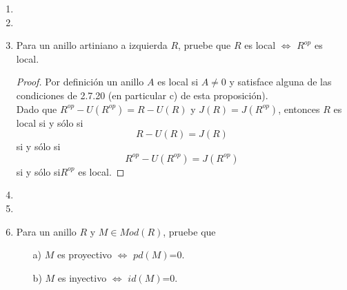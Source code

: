 \documentclass{article}
\begin{document}
\begin{enumerate}[label=\textbf{Ej \arabic*.}]
\begin{proof}
Sea $x\in M$ entonces $x=(x-ex)+ex$ donde $(x-ex)=(1-e)x\in (1-e)M$ y\quad $ex\in eM$. Así $x\in eM\oplus (1-e)M$.\\

Por último, sea $y\in eM$ entonces $y=ex$ para alguna $x\in M$, y por lo anterior, $e(y)=eex=ex=y$. Así $eM=\{m\in M\,|\, e(m)=m\}.$\\
\\
Sea $e=\mu_1\pi_1$ donde $\pi\colon M\longrightarrow M_1$ es la proyección canónica y \\$\mu_1\colon M_1\longrightarrow M$ es la 
inclusión canónica. Entonces $\pi_1\mu_1=Id_{M_1}$, por lo que $e^2(m_1)=\mu_1\pi_1\mu_1\pi_1(m_1)=\mu_1\pi_1(m_1)=e(m_1)$ \,\,
para toda $m_1\in M_1$.\\

Sea $m\in M$ entonces $e(m)=\mu_1\pi_1(m)=\mu_1(\pi_1(m))\in M_1$, por lo que $eM\subseteq M_1$ y todo elemento $x\in M_1$ cumple 
que\\$e(x)=\mu_1\pi_1(x)=\mu_1(x)=x$ por lo que $M_1=eM$.\\

Por otra parte, por a), $M=M_1\oplus(1-e)M$ y por hipótesis $M=M_1\oplus M_2$, entonces $M_2=(1-e)M$ pues si $x\in M$, existe $m_1\in M_1,\,\,
m_2\in M_2\,$ y $m_3\in M$ tales que $x=m_1+m_2=m_1+(1-e)m_3$ por lo que $m_2=(1-e)m_3$.
\end{proof}
\item
\item
\item Para un anillo artiniano a izquierda $R$, pruebe que $R$ es local $\iff$ $R^{op}$ es local.
\begin{proof}
Por definición un anillo $A$ es local si $A\neq 0$ y satisface alguna de las condiciones de 2.7.20 (en particular c) de esta proposición). \\
Dado que $R^{op}-U(R^{op})=R-U(R)$ y $J(R)=J(R^{op})$, entonces $R$ es local si y sólo si 
\[R-U(R)=J(R)\]
si y sólo si
\[R^{op}-U(R^{op})=J(R^{op})\]
si y sólo si\quad  $R^{op}$ es local.
\end{proof}
\item
\item
\item Para un anillo $R$ y $M\in Mod(R)$, pruebe que 
\begin{itemize}
\item[a)] $M$ es proyectivo $\iff$  $pd(M)$=0.
\item[b)] $M$ es inyectivo $\iff$  $id(M)$=0.
\end{itemize}


\end{enumerate}
\end{document}
